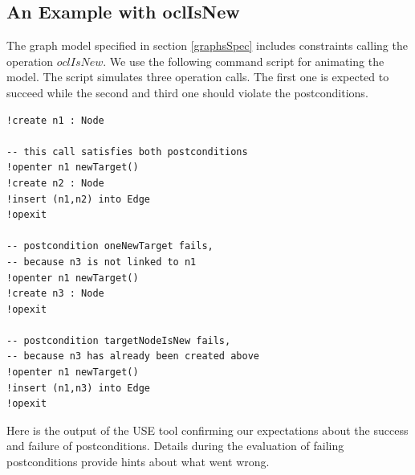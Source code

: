 \documentclass[a4paper,titlepage,oneside,final]{scrreprt} %
\begin{document}
\subsection{An Example with oclIsNew}
The graph model specified in section \ref{graphsSpec} includes
constraints calling the operation $\mathit{oclIsNew}$.
We use the following command script for animating the model.
The script simulates three operation calls.
The first one is expected to succeed while the second
and third one should violate the postconditions.
\begin{verbatim}
!create n1 : Node

-- this call satisfies both postconditions
!openter n1 newTarget()
!create n2 : Node
!insert (n1,n2) into Edge
!opexit

-- postcondition oneNewTarget fails,
-- because n3 is not linked to n1
!openter n1 newTarget()
!create n3 : Node
!opexit

-- postcondition targetNodeIsNew fails,
-- because n3 has already been created above
!openter n1 newTarget()
!insert (n1,n3) into Edge
!opexit
\end{verbatim}
Here is the output of the USE tool confirming our expectations
about the success and failure of postconditions. Details during
the evaluation of failing postconditions provide hints about what went wrong.
\end{document}
